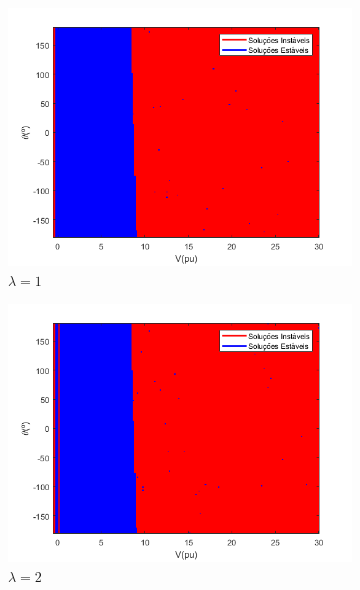 \clearpage
\begin{figure}[H]
    \centering
    \caption{Mapa Fractal FPRET - IEEE 33 Barras}
    \begin{subfigure}[b]{0.45\textwidth}
        \centering
        \includegraphics[width=\textwidth]{textuais/capitulo4/figuras/33_FP_RET_NOM.png}
        \caption{$\lambda=1$}
    \end{subfigure}
    \vfill
    \begin{subfigure}[b]{0.45\textwidth}
        \centering
        \includegraphics[width=\textwidth]{textuais/capitulo4/figuras/33_FP_RET_2lambda.png}
        \caption{$\lambda=2$}
    \end{subfigure}
    \vfill
    \begin{subfigure}[b]{0.45\textwidth}

\end{subfigure}
\end{figure}
